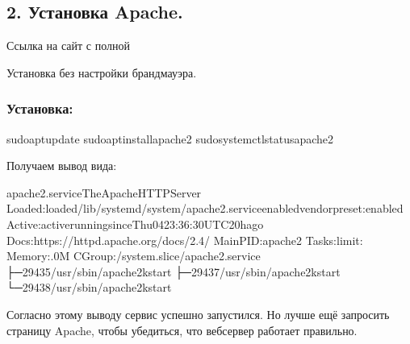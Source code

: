 \documentclass[letterpaper,10pt,russian]{sphinxmanual}
\begin{document}
\subsection{2. Установка Apache.}
\label{\detokenize{docs:apache}}
\sphinxAtStartPar
Ссылка на сайт с полной 

\sphinxAtStartPar
Установка без настройки брандмауэра.


\subsubsection{Установка:}
\label{\detokenize{docs:id4}}
\begin{sphinxVerbatim}[commandchars=\\\{\}]
\PYGZdl{}sudoaptupdate
\PYGZdl{}sudoaptinstallapache2
\PYGZdl{}sudosystemctlstatusapache2
\end{sphinxVerbatim}

\sphinxAtStartPar
Получаем вывод вида:

\begin{sphinxVerbatim}[commandchars=\\\{\}]
apache2.service\PYGZhy{}TheApacheHTTPServer
Loaded:loaded/lib/systemd/system/apache2.serviceenabledvendorpreset:enabled
Active:activerunningsinceThu\PYGZhy{}04\PYGZhy{}23:36:30UTC20hago
Docs:https://httpd.apache.org/docs/2.4/
MainPID:apache2
Tasks:limit:
Memory:.0M
CGroup:/system.slice/apache2.service
├─29435/usr/sbin/apache2\PYGZhy{}kstart
├─29437/usr/sbin/apache2\PYGZhy{}kstart
└─29438/usr/sbin/apache2\PYGZhy{}kstart
\end{sphinxVerbatim}

\sphinxAtStartPar
Согласно этому выводу сервис успешно запустился. Но лучше ещё запросить страницу Apache, чтобы убедиться, что веб\sphinxhyphen{}сервер работает правильно.
\end{document}
